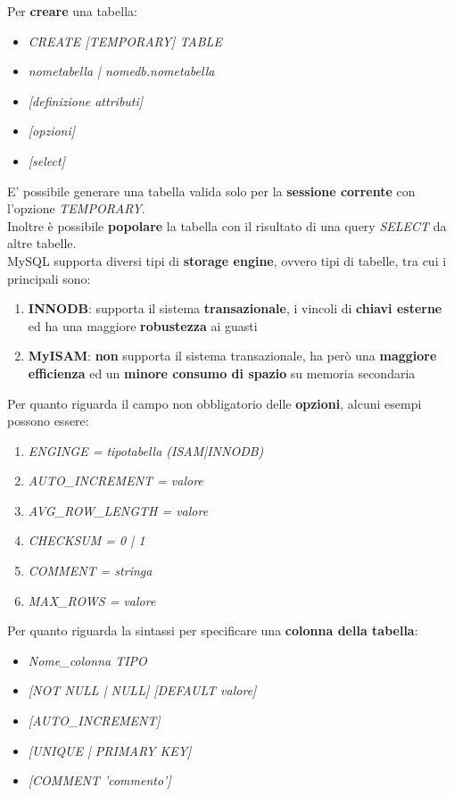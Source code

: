 \documentclass{article}
\begin{document}
Per \textbf{creare} una tabella:
\begin{itemize}[label={ }, leftmargin=1cm]
    \item \textit{CREATE [TEMPORARY] TABLE}
    \item \textit{nometabella | nomedb.nometabella}
    \item \textit{[definizione attributi]}
    \item \textit{[opzioni]}
    \item \textit{[select]}
\end{itemize}
E' possibile generare una tabella valida solo per la \textbf{sessione corrente} con l'opzione \textit{TEMPORARY}.\\
Inoltre è possibile \textbf{popolare} la tabella con il risultato di una query \textit{SELECT} da altre tabelle.\vspace{14pt}\\
MySQL supporta diversi tipi di \textbf{storage engine}, ovvero tipi di tabelle, tra cui i principali sono:
\begin{enumerate}[label={-}, leftmargin=1cm]
    \item \textbf{INNODB}: supporta il sistema \textbf{transazionale}, i vincoli di \textbf{chiavi esterne} ed ha una maggiore \textbf{robustezza} ai guasti
    \item \textbf{MyISAM}: \textbf{non} supporta il sistema transazionale, ha però una \textbf{maggiore efficienza} ed un \textbf{minore consumo di spazio} su memoria secondaria
\end{enumerate}
Per quanto riguarda il campo non obbligatorio delle \textbf{opzioni}, alcuni esempi possono essere:
\begin{enumerate}[label={-}, leftmargin=1cm]
    \item \textit{ENGINGE = tipotabella (ISAM|INNODB)}
    \item \textit{AUTO\_INCREMENT = valore}
    \item \textit{AVG\_ROW\_LENGTH = valore}
    \item \textit{CHECKSUM = {0 | 1}}
    \item \textit{COMMENT = stringa}
    \item \textit{MAX\_ROWS = valore}\\
\end{enumerate}
Per quanto riguarda la sintassi per specificare una \textbf{colonna della tabella}:
\begin{itemize}[label={ }, leftmargin=1cm]
    \item \textit{Nome\_colonna TIPO}
    \item \textit{[NOT NULL | NULL] [DEFAULT valore]}
    \item \textit{[AUTO\_INCREMENT]}
    \item \textit{[UNIQUE | PRIMARY KEY]}
    \item \textit{[COMMENT 'commento']}\\
\end{itemize}
\end{document}
